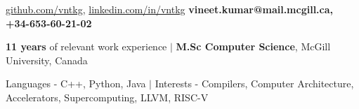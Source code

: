 \documentclass{resume} %
\begin{document}
\begin{hSubsection}
{
    \href{https://github.com/vn7kr}{github.com/vntkg},
    \href{https://linkedin.com/in/vineet7kumar}{linkedin.com/in/vntkg}
}
{
	\textbf{vineet.kumar@mail.mcgill.ca, +34-653-60-21-02}
}
{%
}
\end{hSubsection}



\smallskip \smallskip 
\begin{rSection}{} \smallskip 
\begin{lSubsection} 
\item \textbf{11 years} of relevant work experience
        $\vert$ \textbf{M.Sc Computer Science}, McGill University, Canada
\item Languages - C++, Python, Java $\vert$ Interests - Compilers, Computer Architecture, Accelerators, Supercomputing, LLVM, RISC-V
\end{lSubsection}
\end{rSection}
\end{document}
